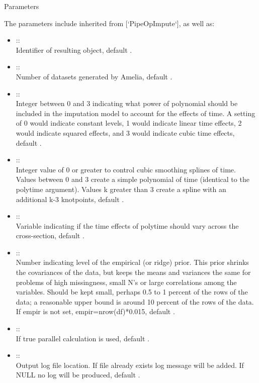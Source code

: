 \documentclass[letterpaper]{book}
\begin{document}
\begin{Section}{Parameters}

The parameters include inherited from [`PipeOpImpute`], as well as: \\{}
\begin{itemize}

\item{}  :: \\{}
Identifier of resulting object, default .
\item{}  :: \\{}
Number of datasets generated by Amelia, default .
\item{}  :: \\{}
Integer between 0 and 3 indicating what power of polynomial should be included in the imputation model to account for the effects of time. A setting of 0 would indicate constant levels, 1 would indicate linear time effects, 2 would indicate squared effects, and 3 would indicate cubic time effects, default .
\item{}  :: \\{}
Integer value of 0 or greater to control cubic smoothing splines of time. Values between 0 and 3 create a simple polynomial of time (identical to the polytime argument). Values k greater than 3 create a spline with an additional k-3 knotpoints, default .
\item{}  :: \\{}
Variable indicating if the time effects of polytime should vary across the cross-section, default .
\item{}  :: \\{}
Number indicating level of the empirical (or ridge) prior. This prior shrinks the covariances of the data, but keeps the means and variances the same for problems of high missingness, small N's or large correlations among the variables. Should be kept small, perhaps 0.5 to 1 percent of the rows of the data; a reasonable upper bound is around 10 percent of the rows of the data. If empir is not set, empir=nrow(df)*0.015, default .
\item{}  :: \\{}
If true parallel calculation is used, default .
\item{}  :: \\{}
Output log file location. If file already exists log message will be added. If NULL no log will be produced, default .

\end{itemize}

\end{Section}
\end{document}
